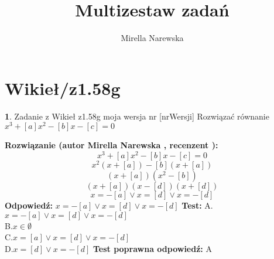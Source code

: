 \documentclass[12pt, a4paper]{article}
\title{Multizestaw zadań}
\author{Mirella Narewska}
\date{}
\theoremstyle{definition} %
\newtheorem{zad}{}
\newcommand{\kategoria}[1]{\section{#1}} %
\newcommand{\zadStart}[1]{\begin{zad}#1\newline} %
\newcommand{\zadStop}{\end{zad}}   %
\newcommand{\rozwStart}[2]{\noindent \textbf{Rozwiązanie (autor #1 , recenzent #2): }\newline} %
\newcommand{\rozwStop}{\newline}                                            %
\newcommand{\odpStart}{\noindent \textbf{Odpowiedź:}\newline}    %
\newcommand{\odpStop}{\newline}                                             %
\newcommand{\testStart}{\noindent \textbf{Test:}\newline} %
\newcommand{\testStop}{\newline} %
\newcommand{\kluczStart}{\noindent \textbf{Test poprawna odpowiedź:}\newline} %
\newcommand{\kluczStop}{\newline} %
\begin{document}
\maketitle


\kategoria{Wikieł/z1.58g}
\zadStart{Zadanie z Wikieł z1.58g  moja wersja nr [nrWersji]}
Rozwiązać równanie $x^3+[a]x^2-[b]x-[c]=0$
\zadStop
\rozwStart{Mirella Narewska}{}
$$x^3+[a]x^2-[b]x-[c]=0$$
$$x^2(x+[a])-[b](x+[a])$$
$$(x+[a])(x^2-[b])$$
$$(x+[a])(x-[d])(x+[d])$$
$$x=-[a] \vee x=[d] \vee x=-[d]$$
\rozwStop
\odpStart
$x=-[a] \vee x=[d] \vee x=-[d]$
\odpStop
\testStart
A.$x=-[a] \vee x=[d] \vee x=-[d]$
\\
B.$x \in \emptyset$
\\
C.$x=[a] \vee x=[d] \vee x=-[d]$
\\
D.$x=[d] \vee x=-[d]$
\testStop
\kluczStart
A
\kluczStop
\end{document}
